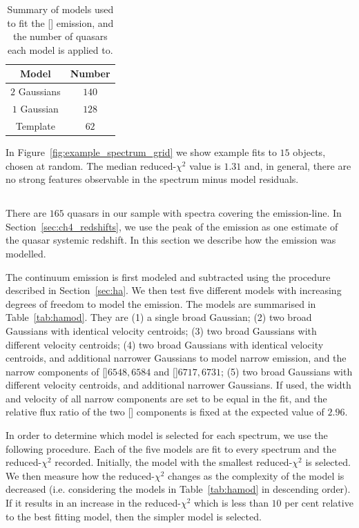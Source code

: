 \begin{table}
  \centering
  \footnotesize 
  \caption{Summary of models used to fit the [] emission, and the number of quasars each model is applied to.}
  \label{tab:oiiimod}
    \begin{tabular}{cc} 
    \hline
    Model & Number \\
    \hline
    $2$ Gaussians &  $140$ \\
    $1$ Gaussian  &  $128$ \\
    Template &  $62$ \\
    \hline
    \end{tabular}
\end{table} 

In Figure~\ref{fig:example_spectrum_grid} we show example fits to $15$ objects, chosen at random. 
The median reduced-$\chi^2$ value is $1.31$ and, in general, there are no strong features observable in the spectrum minus model residuals.

\subsection{\hans}
\label{sec:hamodel}

There are $165$ quasars in our sample with spectra covering the \ha emission-line. 
In Section~\ref{sec:ch4_redshifts}, we use the peak of the \ha emission as one estimate of the quasar systemic redshift. 
In this section we describe how the \ha emission was modelled. 

The continuum emission is first modeled and subtracted using the procedure described in Section~\ref{sec:ha}. 
We then test five different models with increasing degrees of freedom to model the \ha emission. 
The models are summarised in Table~\ref{tab:hamod}. 
They are (1) a single broad Gaussian; (2) two broad Gaussians with identical velocity centroids; (3) two broad Gaussians with different velocity centroids; (4) two broad Gaussians with identical velocity centroids, and additional narrower Gaussians to model narrow \ha emission, and the narrow components of []\ll$6548,6584$ and []\ll$6717,6731$; (5) two broad Gaussians with different velocity centroids, and additional narrower Gaussians. 
If used, the width and velocity of all narrow components are set to be equal in the fit, and the relative flux ratio of the two [] components is fixed at the expected value of $2.96$.

In order to determine which model is selected for each spectrum, we use the following procedure.  
Each of the five models are fit to every spectrum and the reduced-$\chi^2$ recorded.
Initially, the model with the smallest reduced-$\chi^2$ is selected. 
We then measure how the reduced-$\chi^2$ changes as the complexity of the model is decreased (i.e. considering the models in Table~\ref{tab:hamod} in descending order). 
If it results in an increase in the reduced-$\chi^2$ which is less than $10$ per cent relative to the best fitting model, then the simpler model is selected.  

